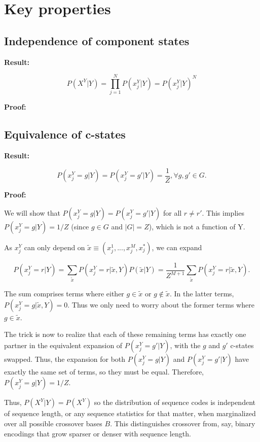 \documentclass{article}
\begin{document}
\section{Key properties}

\subsection{Independence of component states}
\label{sec:prop-ind-c-states}

\textbf{Result:}

$$P(X^Y|Y) = \prod\limits_{j=1}^N P(x^Y_j|Y) = P(x^Y_j|Y)^N$$

\textbf{Proof:}

\subsection{Equivalence of c-states}
\label{sec:prop-equiv-c-states}

\textbf{Result:}

$$P(x^Y_j = g|Y) = P(x^Y_j = g'|Y) = \frac{1}{Z}, \forall g, g' \in G.$$

\textbf{Proof:}

We will show that $P(x^Y_j = g|Y) = P(x^Y_j = g'|Y)$ for all $r \neq r'$. This implies $P(x^Y_j = g|Y) = 1/Z$ (since $g \in G$ and $|G| = Z$), which is not a function of Y.

As $x^Y_j$ can only depend on $\tilde{x} \equiv (x^1_j, ..., x^M_j, x^*_j)$, we can expand

$$P(x^Y_j = r|Y) = \sum\limits_{\tilde{x}} P(x^Y_j = r|\tilde{x}, Y)P(\tilde{x}|Y) = \frac{1}{Z^{M+1}}\sum\limits_{\tilde{x}} P(x^Y_j = r|\tilde{x}, Y).$$

The sum comprises terms where either $g \in \tilde{x}$ or $g \notin \tilde{x}$. In the latter terms, $P(x^Y_j = g|\tilde{x}, Y) = 0$. Thus we only need to worry about the former terms where $g \in \tilde{x}$.

The trick is now to realize that each of these remaining terms has exactly one partner in the equivalent expansion of $P(x^Y_j = g'|Y)$, with the $g$ and $g'$ c-states swapped. Thus, the expansion for both $P(x^Y_j = g|Y)$ and $P(x^Y_j = g'|Y)$ have exactly the same set of terms, so they must be equal. Therefore, $P(x^Y_j = g|Y) = 1/Z$. 

Thus, $P(X^Y|Y) = P(X^Y)$ so the distribution of sequence codes is independent of sequence length, or any sequence statistics for that matter, when marginalized over all possible crossover bases $B$. This distinguishes crossover from, say, binary encodings that grow sparser or denser with sequence length.
\end{document}

